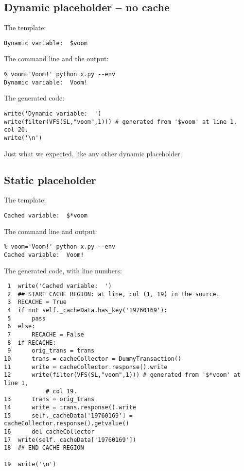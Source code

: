 \subsection{Dynamic placeholder -- no cache}
\label{output.cache.dynamic}

The template:
\begin{verbatim}
Dynamic variable:  $voom
\end{verbatim}

The command line and the output:
\begin{verbatim}
% voom='Voom!' python x.py --env
Dynamic variable:  Voom!
\end{verbatim}

The generated code:
\begin{verbatim}
write('Dynamic variable:  ')
write(filter(VFS(SL,"voom",1))) # generated from '$voom' at line 1, col 20.
write('\n')
\end{verbatim}

Just what we expected, like any other dynamic placeholder.

\subsection{Static placeholder}
\label{output.cache.static}

The template:
\begin{verbatim}
Cached variable:  $*voom
\end{verbatim}

The command line and output:
\begin{verbatim}
% voom='Voom!' python x.py --env
Cached variable:  Voom!
\end{verbatim}

The generated code, with line numbers:
\begin{verbatim}
 1  write('Cached variable:  ')
 2  ## START CACHE REGION: at line, col (1, 19) in the source.
 3  RECACHE = True
 4  if not self._cacheData.has_key('19760169'):
 5      pass
 6  else:
 7      RECACHE = False
 8  if RECACHE:
 9      orig_trans = trans
10      trans = cacheCollector = DummyTransaction()
11      write = cacheCollector.response().write
12      write(filter(VFS(SL,"voom",1))) # generated from '$*voom' at line 1,
            # col 19.
13      trans = orig_trans
14      write = trans.response().write
15      self._cacheData['19760169'] = cacheCollector.response().getvalue()
16      del cacheCollector
17  write(self._cacheData['19760169'])
18  ## END CACHE REGION
    
19  write('\n')
\end{verbatim}

